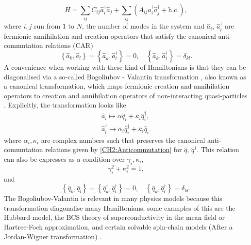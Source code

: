\begin{equation}
\hat{H}=\sum_{i j} C_{i j} \hat{a}_{i}^{\dagger} \hat{a}_{j}+\sum_{i j}\left(A_{i j} \hat{a}_{i}^{\dagger}\hat{a}_{j}^{\dagger}+\mathrm{h.c.}\right),
\label{CH2:QuadraticHamiltonian}
\end{equation}
where $i,j$ run from $1$ to $N$, the number of modes in the system and $\hat{a}_i$, $\hat{a}^{\dagger}_i$ are fermionic annihilation and creation operators that satisfy the canonical anti-commutation relations (CAR) \cite{fradkin_field_1997}
\begin{equation}
\left\{\hat{a}_{k}, \hat{a}_{l}\right\}=\left\{\hat{a}_{k}^{\dagger}, \hat{a}_{l}^{\dagger}\right\}=0, \quad\left\{\hat{a}_{k}, \hat{a}_{l}^{\dagger}\right\}=\delta_{k l}.
\label{CH2:Anticommutation}
\end{equation}
A convenience when working with these kind of Hamiltonians is that they can be diagonalised via a so-called Bogoliubov - Valantin transformation \cite{bogoljubov_new_1958}, also known as a canonical transformation, which maps fermionic creation and annihilation operators to creation and annihilation operators of non-interacting quasi-particles \cite{berezin_method_1966, bogoljubov_new_1958}. Explicitly, the transformation looks like
\begin{equation}
\begin{array}{c}
\hat{a}_{i} \mapsto \alpha \hat{q}_{i}+\kappa_{i} \hat{q}_{i}^{\dagger}, \\
\hat{a}_{i}^{\dagger} \mapsto \bar{\alpha}_{i} \hat{q}_{i}^{\dagger}+\bar{\kappa}_{i} \hat{q}_{i}.
\end{array}
\label{CH2:Bogoliuvov}
\end{equation}
where $\alpha_i , \kappa_i$ are complex numbers such that preserves the canonical anti-commutation relations given by \eqref{CH2:Anticommutation} for $\hat{q}$, $\hat{q}^{\dagger}$. This relation can also be expresses as a condition over $\gamma_i, \kappa_i$,
\begin{equation}
 \gamma_i ^2+ \kappa_i^2 = 1,
\end{equation}
and 
\begin{equation}
	\left\{\hat{q}_{k}, \hat{q}_{l}\right\}=\left\{\hat{q}_{k}^{\dagger}, \hat{q}_{l}^{\dagger}\right\}=0, \quad\left\{\hat{q}_{k}, \hat{q}_{l}^{\dagger}\right\}=\delta_{k l}.
\end{equation}
The Bogoliubov-Valantin is relevant in many physics models because this transformation diagonalise many Hamiltonians; some examples of this are the Hubbard model, the BCS theory of superconductivity in the mean field or Hartree-Fock approximation, and certain solvable spin-chain models (After a Jordan-Wigner transformation) \cite{katsura_statistical_1962, barouch_statistical_1971, barouch_statistical_1970,fradkin_field_1997}.\\

